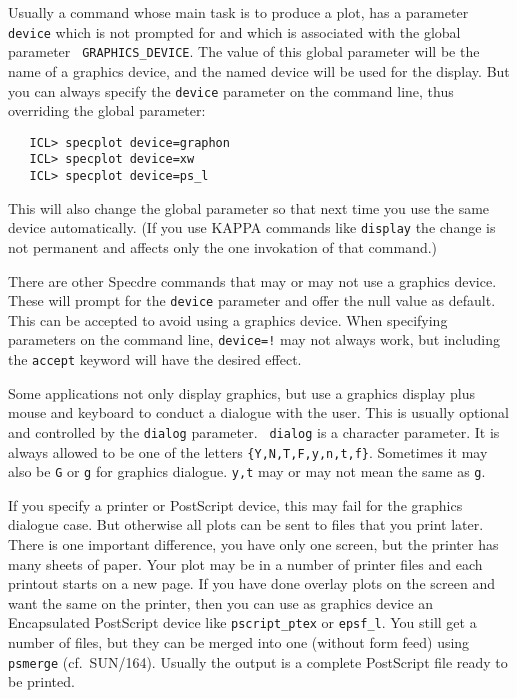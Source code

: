 Usually a command whose main task is to produce a plot,
has a parameter {\tt device} which is not
prompted for and which is associated with the global parameter {\tt
GRAPHICS\_DEVICE}. The value of this global parameter will be the name of a
graphics device, and the named device will be used for the display.
But you can always specify the {\tt device} parameter on the command line, thus
overriding the global parameter:

\begin{verbatim}
   ICL> specplot device=graphon
   ICL> specplot device=xw
   ICL> specplot device=ps_l
\end{verbatim}

This will also change the global parameter so that next time you use the same
device automatically.  (If you use KAPPA commands like {\tt display} the
change is not permanent and affects only the one invokation of that command.)

There are other Specdre commands that may or may not use a graphics device.
These will prompt for the {\tt device} parameter and offer the null value as
default. This can be accepted to avoid using a graphics device. When specifying
parameters on the command line, {\tt device=!} may not always work, but
including the {\tt accept} keyword will have the desired effect.

Some applications not only display graphics, but use a graphics display
plus mouse and keyboard to conduct a dialogue with the user.  This is
usually optional and controlled by the {\tt dialog} parameter.  {\tt
dialog} is a character parameter.  It is always allowed to be one of the
letters {\tt\{Y,N,T,F,y,n,t,f\}}.  Sometimes it may also be {\tt G} or
{\tt g} for graphics dialogue.  {\tt y,t} may or may not mean the same
as {\tt g}.

If you specify a printer or PostScript device, this may fail for the
graphics dialogue case.  But otherwise all plots can be sent to files
that you print later.  There is one important difference, you have only
one screen, but the printer has many sheets of paper.  Your plot may be
in a number of printer files and each printout starts on a new page.  If
you have done overlay plots on the screen and want the same on the
printer, then you can use as graphics device an Encapsulated PostScript
device like {\tt pscript\_ptex} or {\tt epsf\_l}.  You still get a number
of files, but they can be merged into one (without form feed) using {\tt
psmerge} (cf.\ SUN/164).  Usually the output is a complete PostScript
file ready to be printed.

